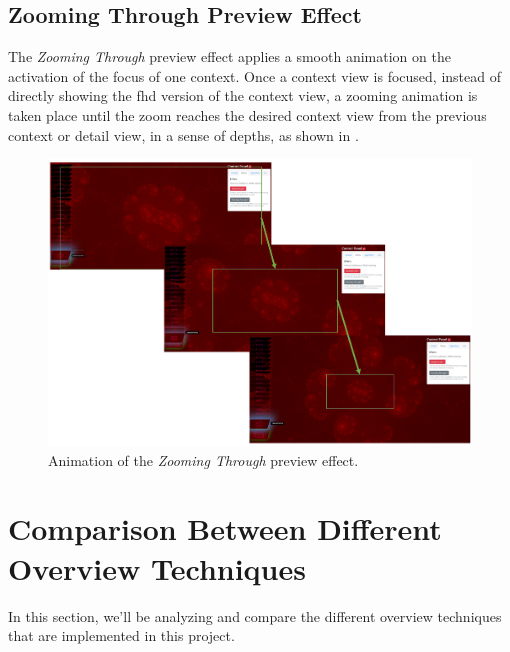 \subsection{Zooming Through Preview Effect}
\label{chap5:zoom}

The \emph{Zooming Through} preview effect applies a smooth animation on the activation of the focus of one context. Once a context view is focused, instead of directly showing the \gls{fhd} version of the context view, a zooming animation is taken place until the zoom reaches the desired context view from the previous context or detail view, in a sense of depths, as shown in .

\begin{figure}[H]
\centering
\includegraphics[width=\textwidth,keepaspectratio]{Figures/Chapter5/zoompreview.png}
\decoRule
\caption[Zooming Through Preview Effect]{Animation of the \emph{Zooming Through} preview effect.}
\label{fig:chap5:zoompreview}
\end{figure}


\section{Comparison Between Different Overview Techniques}

In this section, we'll be analyzing and compare the different overview techniques that are implemented in this project.

